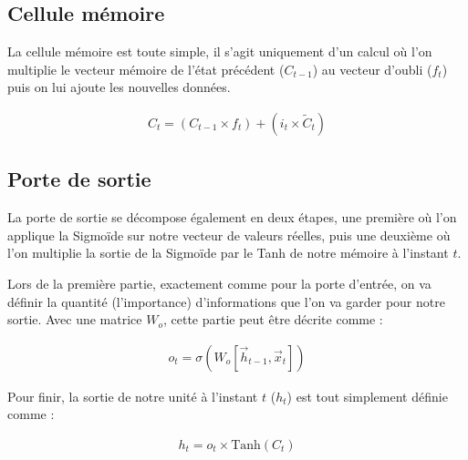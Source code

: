 \subsection{Cellule mémoire}

La cellule mémoire est toute simple, il s’agit uniquement d’un calcul où l’on multiplie le vecteur mémoire de l’état précédent ($C_{t-1}$) au vecteur d’oubli ($f_{t}$) puis on lui ajoute les nouvelles données.

{\Large
	\setlength{\abovedisplayskip}{-0.5cm}
	\begin{gather*}
		C_{t} = (C_{t-1}\times f_{t}) + (i_{t}\times\tilde{C}_{t})
	\end{gather*}
}

\subsection{Porte de sortie}

La porte de sortie se décompose également en deux étapes, une première où l’on applique la Sigmoïde sur notre vecteur de valeurs réelles, puis une deuxième où l'on multiplie la sortie de la Sigmoïde par le Tanh de notre mémoire à l’instant $t$.

Lors de la première partie, exactement comme pour la porte d’entrée, on va définir la quantité (l’importance) d’informations que l’on va garder pour notre sortie. Avec une matrice $W_{o}$, cette partie peut être décrite comme :

{\Large%
	\setlength{\abovedisplayskip}{-0.5cm}
	\begin{gather*}
		o_{t} = \sigma(W_{o}[\overrightarrow{h}_{t-1}, \overrightarrow{x}_{t}])
	\end{gather*}
}%

Pour finir, la sortie de notre unité à l’instant $t$ ($h_{t}$) est tout simplement définie comme :

{\Large%
	\setlength{\abovedisplayskip}{-0.5cm}
	\begin{gather*}
		h_{t} = o_{t}\times\text{Tanh}(C_{t})
	\end{gather*}
}%
